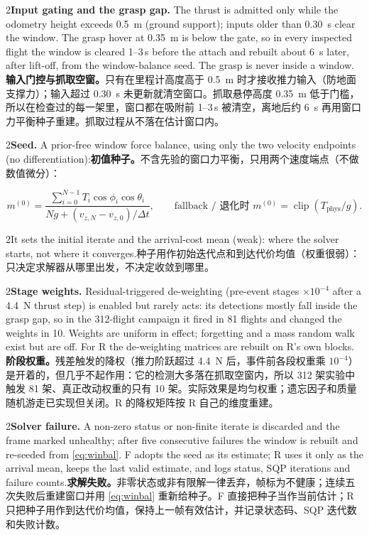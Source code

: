 \documentclass[10pt,a4paper]{article}
\numberwithin{equation}{section}
\newcommand{\Tphys}{T_{\mathrm{phys}}}
\newcommand{\pair}[2]{\begin{paracol}{2}#1\switchcolumn #2\end{paracol}}
\begin{document}
\pair{\textbf{Input gating and the grasp gap.} The thrust is admitted only while
the odometry height exceeds \SI{0.5}{\meter} (ground support); inputs older than
\SI{0.30}{\second} clear the window. The grasp hover at \SI{0.35}{\meter} is below
the gate, so in every inspected flight the window is cleared 1--3\,s before the
attach and rebuilt about \SI{6}{\second} later, after lift-off, from the
window-balance seed. The grasp is never inside a window.}
{\textbf{输入门控与抓取空窗。}只有在里程计高度高于 \SI{0.5}{\meter} 时才接收推力输入（防地面支撑力）；输入超过 \SI{0.30}{\second} 未更新就清空窗口。抓取悬停高度 \SI{0.35}{\meter} 低于门槛，所以在检查过的每一架里，窗口都在吸附前 1--3\,s 被清空，离地后约 \SI{6}{\second} 再用窗口力平衡种子重建。抓取过程从不落在估计窗口内。}

\pair{\textbf{Seed.} A prior-free window force balance, using only the two
velocity endpoints (no differentiation):}
{\textbf{初值种子。}不含先验的窗口力平衡，只用两个速度端点（不做数值微分）：}
\begin{equation}
m^{(0)}=\frac{\sum_{i=0}^{N-1}T_i\cos\phi_i\cos\theta_i}{Ng+(v_{z,N}-v_{z,0})/\Delta t},
\qquad\text{fallback / 退化时 } m^{(0)}=\operatorname{clip}(\Tphys/g).
\label{eq:winbal}
\end{equation}
\pair{It sets the initial iterate and the arrival-cost mean (weak): where the
solver starts, not where it converges.}
{种子用作初始迭代点和到达代价均值（权重很弱）：只决定求解器从哪里出发，不决定收敛到哪里。}

\pair{\textbf{Stage weights.} Residual-triggered de-weighting (pre-event stages
$\times10^{-4}$ after a \SI{4.4}{\newton} thrust step) is enabled but rarely acts:
its detections mostly fall inside the grasp gap, so in the 312-flight campaign it
fired in 81 flights and changed the weights in 10. Weights are uniform in effect;
forgetting and a mass random walk exist but are off. For R the de-weighting
matrices are rebuilt on R's own blocks.}
{\textbf{阶段权重。}残差触发的降权（推力阶跃超过 \SI{4.4}{\newton} 后，事件前各段权重乘 $10^{-4}$）是开着的，但几乎不起作用：它的检测大多落在抓取空窗内，所以 312 架实验中触发 81 架、真正改动权重的只有 10 架。实际效果是均匀权重；遗忘因子和质量随机游走已实现但关闭。R 的降权矩阵按 R 自己的维度重建。}

\pair{\textbf{Solver failure.} A non-zero status or non-finite iterate is
discarded and the frame marked unhealthy; after five consecutive failures the
window is rebuilt and re-seeded from \eqref{eq:winbal}. F adopts the seed as its
estimate; R uses it only as the arrival mean, keeps the last valid estimate, and
logs status, SQP iterations and failure counts.}
{\textbf{求解失败。}非零状态或非有限解一律丢弃，帧标为不健康；连续五次失败后重建窗口并用 \eqref{eq:winbal} 重新给种子。F 直接把种子当作当前估计；R 只把种子用作到达代价均值，保持上一帧有效估计，并记录状态码、SQP 迭代数和失败计数。}
\end{document}
